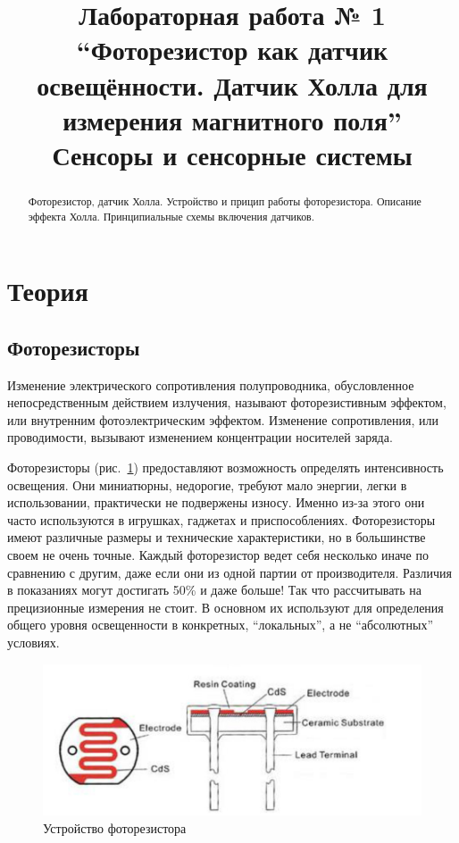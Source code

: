 \documentclass[12pt]{article}
\title{Лабораторная работа № 1 \\
``Фоторезистор как датчик освещённости. Датчик Холла для измерения магнитного поля'' \\
\large Сенсоры и сенсорные системы}
\begin{document}
\maketitle
\tableofcontents
\begin{abstract}
    Фоторезистор, датчик Холла. Устройство и прицип работы фоторезистора.
    Описание эффекта Холла. Принципиальные схемы включения датчиков.
\end{abstract}

\section{Теория}
\subsection{Фоторезисторы}

Изменение электрического сопротивления полупроводника, обусловленное непосредственным действием излучения, называют фоторезистивным эффектом, или внутренним фотоэлектрическим эффектом. Изменение сопротивления, или проводимости, вызывают изменением концентрации носителей заряда.

Фоторезисторы (рис.~\ref{phr}) предоставляют возможность определять интенсивность освещения. Они миниатюрны, недорогие, требуют мало энергии, легки в использовании, практически не подвержены износу. Именно из-за этого они часто используются в игрушках, гаджетах и приспособлениях. Фоторезисторы имеют различные размеры и технические характеристики, но в большинстве своем не очень точные. Каждый фоторезистор ведет себя несколько иначе по сравнению с другим, даже если они из одной партии от производителя. Различия в показаниях могут достигать 50\% и даже больше! Так что рассчитывать на прецизионные измерения не стоит. В основном их используют для определения общего уровня освещенности в конкретных, ``локальных'', а не ``абсолютных'' условиях.

\begin{figure}[H]
    \centering
    \includegraphics[scale=0.7]{images/photoresistor.png}
    \caption{Устройство фоторезистора}\label{phr}
\end{figure}
\end{document}
